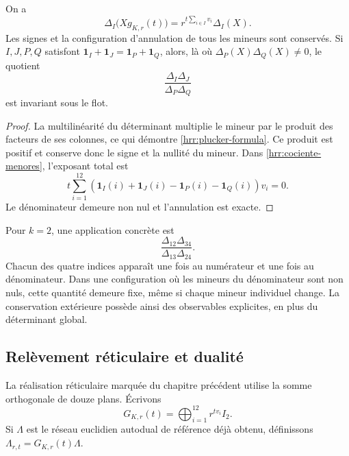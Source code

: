 \begin{proposition}
\label{hrr:plucker}
On a
\begin{equation}
 \Delta_I\bigl(Xg_{K,r}(t)\bigr)
 =r^{t\sum_{i\in I}v_i}\Delta_I(X).
 \label{hrr:plucker-formula}
\end{equation}
Les signes et la configuration d’annulation de tous les mineurs sont conservés. Si \(I,J,P,Q\) satisfont \(\mathbf1_I+\mathbf1_J=\mathbf1_P+\mathbf1_Q\), alors, là où \(\Delta_P(X)\Delta_Q(X)\neq0\), le quotient
\begin{equation}
 \frac{\Delta_I\Delta_J}{\Delta_P\Delta_Q}
 \label{hrr:cociente-menores}
\end{equation}
est invariant sous le flot.
\end{proposition}
\begin{proof}
La multilinéarité du déterminant multiplie le mineur par le produit des facteurs de ses colonnes, ce qui démontre \eqref{hrr:plucker-formula}. Ce produit est positif et conserve donc le signe et la nullité du mineur. Dans \eqref{hrr:cociente-menores}, l’exposant total est
\[
 t\sum_{i=1}^{12}
 (\mathbf1_I(i)+\mathbf1_J(i)-\mathbf1_P(i)-\mathbf1_Q(i))v_i=0.
\]
Le dénominateur demeure non nul et l’annulation est exacte.
\end{proof}

Pour \(k=2\), une application concrète est
\[
 \frac{\Delta_{12}\Delta_{34}}{\Delta_{13}\Delta_{24}}.
\]
Chacun des quatre indices apparaît une fois au numérateur et une fois au dénominateur. Dans une configuration où les mineurs du dénominateur sont non nuls, cette quantité demeure fixe, même si chaque mineur individuel change. La conservation extérieure possède ainsi des observables explicites, en plus du déterminant global.

\subsection{Relèvement réticulaire et dualité}

La réalisation réticulaire marquée du chapitre précédent utilise la somme orthogonale de douze plans. Écrivons
\[
 G_{K,r}(t)=\bigoplus_{i=1}^{12}r^{tv_i}I_2.
\]
Si \(\Lambda\) est le réseau euclidien autodual de référence déjà obtenu, définissons \(\Lambda_{r,t}=G_{K,r}(t)\Lambda\).

